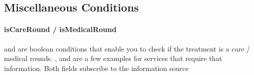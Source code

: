\subsection{Miscellaneous Conditions}\label{subsec:miscellaneous-conditions}

\paragraph{isCareRound / isMedicalRound}
 and  are boolean conditions that enable you to check if the treatment is a care / medical rounds.
,  and  are a few examples for services that require that information.
Both fields subscribe to the information source 

